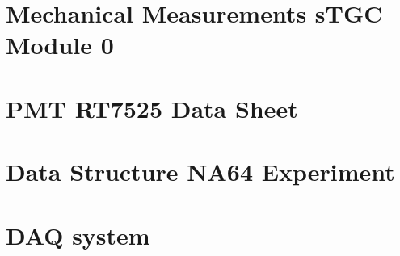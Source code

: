 \section{Mechanical Measurements sTGC Module 0}
\section{PMT RT7525 Data Sheet}
\section{Data Structure NA64 Experiment}
\section{DAQ system}

